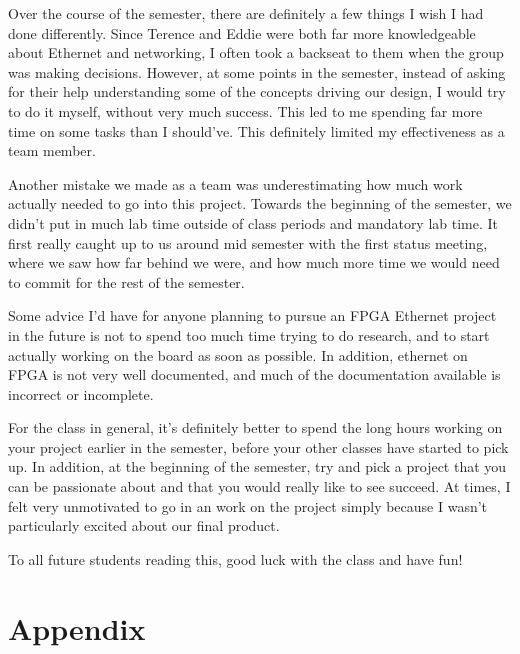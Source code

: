 \documentclass[12pt]{report}
\begin{document}
Over the course of the semester, there are definitely a few things I wish I had done differently. Since Terence and Eddie were both far more knowledgeable about Ethernet and networking, I often took a backseat to them when the group was making decisions. However, at some points in the semester, instead of asking for their help understanding some of the concepts driving our design, I would try to do it myself, without very much success. This led to me spending far more time on some tasks than I should've. This definitely limited my effectiveness as a team member.

Another mistake we made as a team was underestimating how much work actually needed to go into this project. Towards the beginning of the semester, we didn't put in much lab time outside of class periods and mandatory lab time. It first really caught up to us around mid semester with the first status meeting, where we saw how far behind we were, and how much more time we would need to commit for the rest of the semester.

Some advice I'd have for anyone planning to pursue an FPGA Ethernet project in the future is not to spend too much time trying to do research, and to start actually working on the board as soon as possible. In addition, ethernet on FPGA is not very well documented, and much of the documentation available is incorrect or incomplete.

For the class in general, it's definitely better to spend the long hours working on your project earlier in the semester, before your other classes have started to pick up. In addition, at the beginning of the semester, try and pick a project that you can be passionate about and that you would really like to see succeed. At times, I felt very unmotivated to go in an work on the project simply because I wasn't particularly excited about our final product.

To all future students reading this, good luck with the class and have fun!

\printbibliography
\appendix
\chapter{Appendix}
\end{document}
